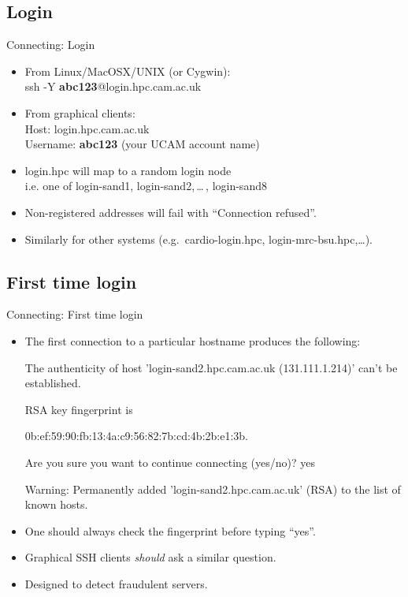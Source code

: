\subsection{Login}
\begin{frame}{Connecting: Login}
\begin{itemize}
\item From Linux/MacOSX/UNIX (or Cygwin):\hfill\\
\alert{ssh -Y \textbf{abc123}@login.hpc.cam.ac.uk}
\pause
\item From graphical clients:\hfill\\
Host: \alert{login.hpc.cam.ac.uk}\hfill\\
Username: \alert{\textbf{abc123}} (your UCAM account name)
\pause
\item login.hpc will map to a random login node\hfill\\
\alert{i.e. one of login-sand1, login-sand2,\,\ldots\,, login-sand8}\hfill\\
\item<5->Non-registered addresses will fail with ``Connection refused''.
\item<6->Similarly for other systems (e.g.\ cardio-login.hpc, login-mrc-bsu.hpc,\ldots). 
\end{itemize}
\end{frame}

\subsection{First time login}
\begin{frame}{Connecting: First time login}
\begin{itemize}
\item{The first connection to a particular hostname produces the following:}
\begin{semiverbatim}\footnotesize
The authenticity of host 'login-sand2.hpc.cam.ac.uk (131.111.1.214)' can't be established.

RSA key fingerprint is

{\color<2->{red}0b:ef:59:90:fb:13:4a:c9:56:82:7b:cd:4b:2b:e1:3b}.

Are you sure you want to continue connecting (yes/no)? {\color<3->{red}yes}

Warning: Permanently added 'login-sand2.hpc.cam.ac.uk' (RSA) to the list of known hosts.
\end{semiverbatim}
\smallskip\item{\alert{One should always check the fingerprint before typing ``yes''.}}
\item{Graphical SSH clients \emph{should} ask a similar question.}
\item{Designed to detect fraudulent servers.}
\end{itemize}
\end{frame}

